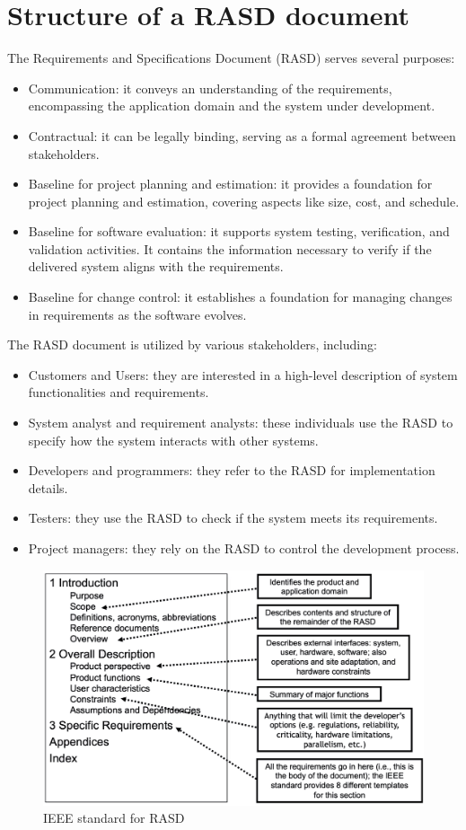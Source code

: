 \documentclass[12pt, a4paper]{report}
\begin{document}
    \section{Structure of a RASD document}
        The Requirements and Specifications Document (RASD) serves several purposes:
        \begin{itemize}
            \item Communication: it conveys an understanding of the requirements, encompassing the application domain and the system under development.
            \item Contractual: it can be legally binding, serving as a formal agreement between stakeholders.
            \item Baseline for project planning and estimation: it provides a foundation for project planning and estimation, covering aspects like size, cost, and schedule.
            \item Baseline for software evaluation: it supports system testing, verification, and validation activities. 
                It contains the information necessary to verify if the delivered system aligns with the requirements.
            \item Baseline for change control: it establishes a foundation for managing changes in requirements as the software evolves.
        \end{itemize}
        The RASD document is utilized by various stakeholders, including:
        \begin{itemize}
            \item Customers and Users: they are interested in a high-level description of system functionalities and requirements.
            \item System analyst and requirement analysts: these individuals use the RASD to specify how the system interacts with other systems.
            \item Developers and programmers: they refer to the RASD for implementation details.
            \item Testers: they use the RASD to check if the system meets its requirements.
            \item Project managers: they rely on the RASD to control the development process.
        \end{itemize}
        \begin{figure}[H]
            \centering
            \includegraphics[width=0.75\linewidth]{images/RASD.png}
            \caption{IEEE standard for RASD}
        \end{figure}
         
\end{document}
